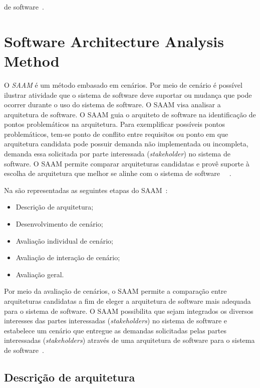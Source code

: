 de software~\cite{ATAM}.

\section{Software Architecture Analysis Method}
\label{sec:SAAM}
O \emph{\acrfull{SAAM}} é um método embasado em cenários. Por meio de cenário é possível ilustrar atividade que o sistema de software deve suportar ou mudança que pode ocorrer durante o uso do sistema de software. O SAAM visa analisar a arquitetura de software. O SAAM guia o arquiteto de software na identificação de pontos problemáticos na arquitetura. Para exemplificar possíveis pontos problemáticos, tem-se ponto de conflito entre requisitos ou ponto em que arquitetura candidata pode possuir demanda não implementada ou incompleta, demanda essa solicitada por parte interessada (\emph{stakeholder}) no sistema de software. O SAAM permite comparar arquiteturas candidatas e provê suporte à escolha de arquitetura que melhor se alinhe com o sistema de software ~\cite{survey_methods}~\cite{scenario_methods}.

%

Na  são representadas as seguintes etapas do SAAM~\cite{scenario_methods}:
\begin{itemize}
    \item Descrição de arquitetura;
    \item Desenvolvimento de cenário;
    \item Avaliação individual de cenário;
    \item Avaliação de interação de cenário;
    \item Avaliação geral.
\end{itemize}

Por meio da avaliação de cenários, o SAAM permite a comparação entre  arquiteturas candidatas a fim de eleger a arquitetura de software mais adequada para o sistema de software. O SAAM possibilita que sejam integrados os diversos interesses das partes interessadas (\emph{stakeholders}) no sistema de software e estabelece um cenário que entregue as demandas solicitadas pelas partes interessadas (\emph{stakeholders}) através de uma arquitetura de software para o sistema de software~\cite{survey_methods}.

\subsection{Descrição de arquitetura}

